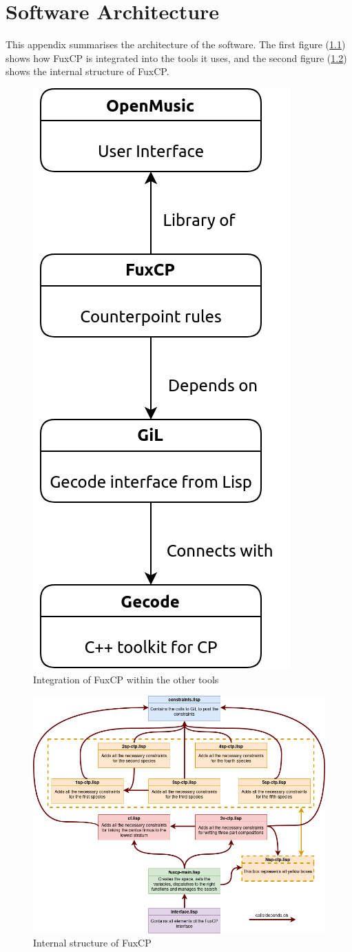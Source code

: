 \chapter{Software Architecture}\label{chapter:architecture}
This appendix summarises the architecture of the software. The first figure (\ref{fig:integration}) shows how FuxCP is integrated into the tools it uses, and the second figure (\ref{fig:softwarearchitecure}) shows the internal structure of FuxCP.

\begin{figure}[h]
    \centering
    \includegraphics[width=.3\textwidth]{Images/macro_arch.png}
    \caption{Integration of FuxCP within the other tools}
    \label{fig:integration}
\end{figure}

\begin{figure}[h]
    \centering
    \includegraphics[width=1\textwidth]{Images/structure_memoire.png}
    \caption{Internal structure of FuxCP}
    \label{fig:softwarearchitecure}
\end{figure}